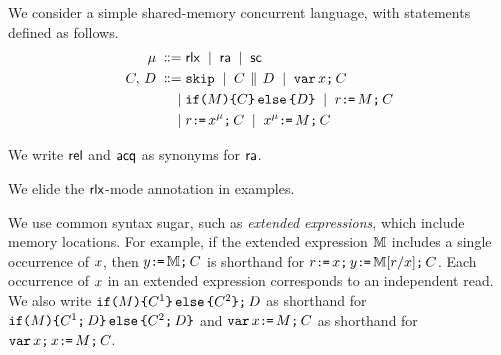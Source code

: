 We consider a simple shared-memory concurrent language, with statements
defined as follows.
\begin{align*}
  \amode \BNFDEF& \modeRLX \BNFSEP \modeRA \BNFSEP \modeSC
  \\
\aCmd,\,\bCmd
\BNFDEF& \SKIP
\BNFSEP \aCmd \PAR \bCmd
\BNFSEP \VAR\aLoc\SEMI \aCmd
\\
\BNFSEP& \IF{\aExp} \THEN \aCmd \ELSE \bCmd \FI
\BNFSEP \aReg\GETS\aExp\SEMI \aCmd
\\
\BNFSEP& \aReg\GETS\aLoc^{\amode}\SEMI \aCmd 
\BNFSEP \aLoc^{\amode}\GETS\aExp\SEMI \aCmd
\end{align*}

We write $\modeREL$ and $\modeACQ$ as synonyms for $\modeRA$.

We elide the $\modeRLX$-mode annotation in examples.

We use common syntax sugar, such as \emph{extended expressions}, which include
memory locations.  For example, if the extended expression $\aEExp$ includes
a single occurrence of $\aLoc$, then $\bLoc\GETS\aEExp\SEMI \aCmd$ is
shorthand for $\aReg\GETS\aLoc\SEMI\bLoc\GETS\aEExp[\aReg/\aLoc]\SEMI \aCmd$.
Each occurrence of $\aLoc$ in an extended expression corresponds to an
independent read.  We also write
$\IF{\aExp} \THEN \aCmd^1 \ELSE \aCmd^2 \FI \SEMI \bCmd$ as shorthand for
$\IF{\aExp} \THEN \aCmd^1 \SEMI \bCmd\ELSE \aCmd^2 \SEMI \bCmd\FI$ and
$\VAR\aLoc\GETS\aExp\SEMI \aCmd$ as shorthand for
$\VAR\aLoc\SEMI\aLoc\GETS\aExp\SEMI \aCmd$.

